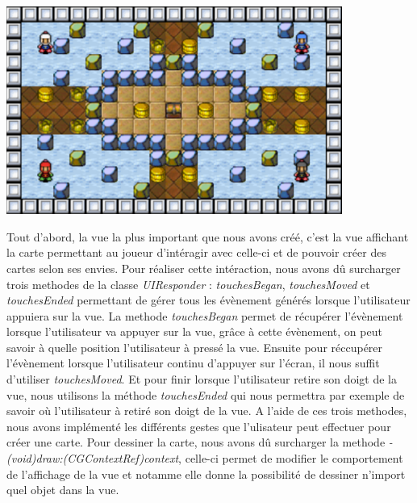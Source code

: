 		\begin{center}
			\includegraphics[width=11cm]{./Developpement/Img/carte.pdf}
		\end{center}
		Tout d'abord, la vue la plus important que nous avons créé, c'est la vue affichant la carte permettant au joueur d'intéragir avec celle-ci et de pouvoir créer des cartes selon ses envies. Pour réaliser cette intéraction, nous avons dû surcharger trois methodes de la classe \textit{UIResponder} : \textit{touchesBegan}, \textit{touchesMoved} et \textit{touchesEnded} permettant de gérer tous les évènement générés lorsque l'utilisateur appuiera sur la vue. La methode \textit{touchesBegan} permet de récupérer l'évènement lorsque l'utilisateur va appuyer sur la vue, grâce à cette évènement, on peut savoir à quelle position l'utilisateur à pressé la vue. Ensuite pour réccupérer l'évènement lorsque l'utilisateur continu d'appuyer sur l'écran, il nous suffit d'utiliser \textit{touchesMoved}. Et pour finir lorsque l'utilisateur retire son doigt de la vue, nous utilisons la méthode \textit{touchesEnded} qui nous permettra par exemple de savoir où l'utilisateur à retiré son doigt de la vue. A l'aide de ces trois methodes, nous avons implémenté les différents gestes que l'ulisateur peut effectuer pour créer une carte. Pour dessiner la carte, nous avons dû surcharger la methode \textit{- (void)draw:(CGContextRef)context}, celle-ci permet de modifier le comportement de l'affichage de la vue et notamme elle donne la possibilité de dessiner n'import quel objet dans la vue.
		
